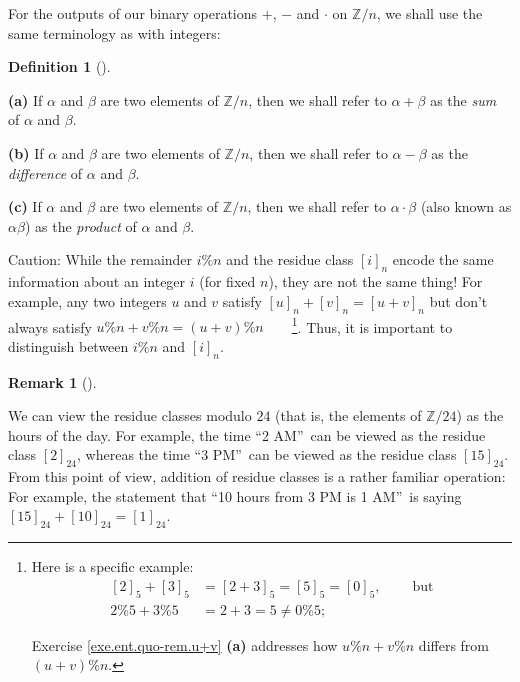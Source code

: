 \documentclass[numbers=enddot,12pt,final,onecolumn,notitlepage]{scrartcl}%
\numberwithin{exer}{subsection}
\theoremstyle{definition}
\newtheorem{defi}[theo]{Definition}
\newenvironment{definition}[1][]
{\begin{defi}[#1]\begin{leftbar}}
{\end{leftbar}\end{defi}}
\newtheorem{remk}[theo]{Remark}
\newenvironment{remark}[1][]
{\begin{remk}[#1]\begin{leftbar}}
{\end{leftbar}\end{remk}}
\begin{document}
For the outputs of our binary operations $+$, $-$ and $\cdot$ on
$\mathbb{Z}/n$, we shall use the same terminology as with integers:

\begin{definition}
\label{def.eqrel.Z/n.sum-diff-prod}\textbf{(a)} If $\alpha$ and $\beta$ are
two elements of $\mathbb{Z}/n$, then we shall refer to $\alpha+\beta$ as the
\textit{sum} of $\alpha$ and $\beta$.

\textbf{(b)} If $\alpha$ and $\beta$ are two elements of $\mathbb{Z}/n$, then
we shall refer to $\alpha-\beta$ as the \textit{difference} of $\alpha$ and
$\beta$.

\textbf{(c)} If $\alpha$ and $\beta$ are two elements of $\mathbb{Z}/n$, then
we shall refer to $\alpha\cdot\beta$ (also known as $\alpha\beta$) as the
\textit{product} of $\alpha$ and $\beta$.
\end{definition}

Caution: While the remainder $i\%n$ and the residue class $\left[  i\right]
_{n}$ encode the same information about an integer $i$ (for fixed $n$), they
are not the same thing! For example, any two integers $u$ and $v$ satisfy
$\left[  u\right]  _{n}+\left[  v\right]  _{n}=\left[  u+v\right]  _{n}$ but
don't always satisfy $u\%n+v\%n=\left(  u+v\right)  \%n$\ \ \ \ \footnote{Here
is a specific example:%
\begin{align*}
\left[  2\right]  _{5}+\left[  3\right]  _{5}  &  =\left[  2+3\right]
_{5}=\left[  5\right]  _{5}=\left[  0\right]  _{5}%
,\ \ \ \ \ \ \ \ \ \ \text{but}\\
2\%5+3\%5  &  =2+3=5\neq0\%5;
\end{align*}
\par
Exercise \ref{exe.ent.quo-rem.u+v} \textbf{(a)} addresses how $u\%n+v\%n$
differs from $\left(  u+v\right)  \%n$.}. Thus, it is important to distinguish
between $i\%n$ and $\left[  i\right]  _{n}$.

\begin{remark}
We can view the residue classes modulo $24$ (that is, the elements of
$\mathbb{Z}/24$) as the hours of the day. For example, the time
\textquotedblleft2 AM\textquotedblright\ can be viewed as the residue class
$\left[  2\right]  _{24}$, whereas the time \textquotedblleft3
PM\textquotedblright\ can be viewed as the residue class $\left[  15\right]
_{24}$. From this point of view, addition of residue classes is a rather
familiar operation: For example, the statement that \textquotedblleft10 hours
from 3 PM is 1 AM\textquotedblright\ is saying $\left[  15\right]
_{24}+\left[  10\right]  _{24}=\left[  1\right]  _{24}$.
\end{remark}
\end{document}
